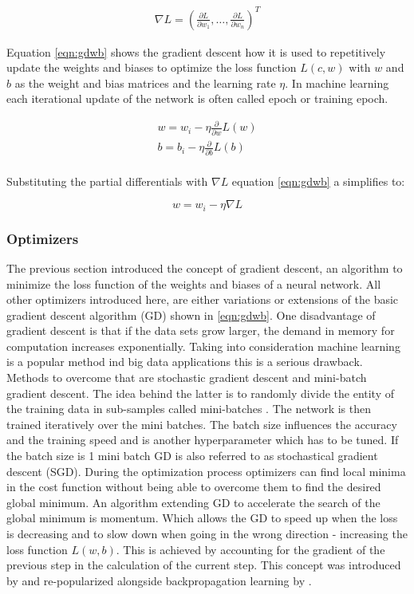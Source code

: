 \begin{eqnarray}
 \nabla L = \left(\frac{\partial L}{\partial w_1}, \ldots ,
 \frac{\partial L}{\partial w_n}\right)^T
 \label{eqn:gd}
\end{eqnarray}

Equation \ref{eqn:gdwb} shows the gradient descent how it is used to repetitively update the weights and
biases to optimize the loss function $L(c,w)$ with $w$ and $b$ as the weight and bias matrices and the
learning rate $\eta$. In machine learning each iterational update of the network is often called epoch or
training epoch.

\begin{subequations}
 \begin{align}
   w = w_i - \eta \frac{\partial}{\partial w}L(w) \\
   b = b_i - \eta \frac{\partial}{\partial b}L(b) \\
 \end{align}
 \label{eqn:gdwb}
\end{subequations}

Substituting the partial differentials with $\nabla L$ equation \ref{eqn:gdwb} a simplifies to:

\begin{equation}
  w = w_i - \eta  \nabla L
  \label{eqn:simplegd}  
\end{equation}

\subsubsection{Optimizers}
The previous section introduced the concept of gradient descent, an algorithm to minimize the loss function of
the weights and biases of a neural network. All other optimizers introduced here, are either variations or
extensions of the basic gradient descent algorithm (GD) shown in \ref{eqn:gdwb}. One disadvantage of gradient
descent is that if the data sets grow larger, the demand in memory for computation increases
exponentially. Taking into consideration machine learning is a popular method ind big data applications this
is a serious drawback. Methods to overcome that are stochastic gradient descent and mini-batch gradient
descent.  The idea behind the latter is to randomly divide the entity of the training data in sub-samples
called mini-batches \cite{bottou-bousquet-2008}. The network is then trained iteratively over the mini
batches. The batch size influences the accuracy and the training speed and is another hyperparameter which has
to be tuned. If the batch size is 1 mini batch GD is also referred to as stochastical gradient descent (SGD).
During the optimization process optimizers can find local minima in the cost function without being able to
overcome them to find the desired global minimum. An algorithm extending GD to accelerate the search of the
global minimum is momentum. Which allows the GD to speed up when the loss is decreasing and to slow down when
going in the wrong direction - increasing the loss function $L(w,b)$. This is achieved by accounting for the
gradient of the previous step in the calculation of the current step. This concept was introduced by
\cite{polyak1964} and re-popularized alongside backpropagation learning by \cite{rumelhart1988learning}.

